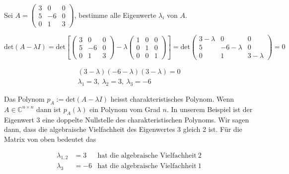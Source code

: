 Sei \( A = \begin{pmatrix} 3 & 0 & 0 \\ 5 & -6 & 0 \\ 0 & 1 & 3 \end{pmatrix} \), bestimme alle Eigenwerte \( \lambda_i \) von \( A \).

\vspace{1\baselineskip}

\begin{equation*}
    \text{det}(A - \lambda I) = \text{det} \left[ \begin{pmatrix} 3 & 0 & 0 \\ 5 & -6 & 0 \\ 0 & 1 & 3 \end{pmatrix} - \lambda \begin{pmatrix} 1 & 0 & 0 \\ 0 & 1 & 0 \\ 0 & 0 & 1 \end{pmatrix}\right] = \text{det} \begin{pmatrix} 3-\lambda & 0 & 0 \\ 5 & -6-\lambda & 0 \\ 0 & 1 & 3-\lambda \end{pmatrix} = 0
\end{equation*}

\begin{equation*}
    \begin{aligned}
        (3 - \lambda)(-6 - \lambda)(3 - \lambda) = 0 \\[1em]
        \lambda_1 = 3,\ \lambda_2 = 3,\ \lambda_3 = -6
    \end{aligned}
\end{equation*}

Das Polynom \( p_A := \text{det}(A - \lambda I) \) heisst charakteristisches Polynom. Wenn \( A \in \mathbb{C}^{n \times n} \) dann ist \( p_A(\lambda) \) ein Polynom vom Grad \( n \). In unserem Beispiel ist der Eigenwert 3 eine doppelte Nullstelle des charakteristischen Polynoms. Wir sagen dann, dass die algebraische Vielfachheit des Eigenwertes 3 gleich 2 ist. Für die Matrix von oben bedeutet das

\begin{equation*}
    \begin{aligned}
        \lambda_{1,2} &= 3 &\text{hat die algebraische Vielfachheit}\ 2 \\
        \lambda_3 &= -6 &\text{hat die algebraische Vielfachheit}\ 1
    \end{aligned}
\end{equation*}

